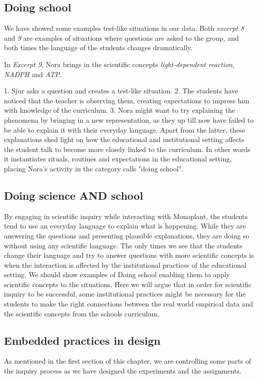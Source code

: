 \subsection{Doing school}
We have showed some examples test-like situations in our data. Both \emph{excerpt 8} and \emph{9} are examples of situations where questions are asked to the group, and both times the language of the students changes dramatically. 

In \emph{Excerpt 9}, Nora brings in the scientific concepts \emph{light-dependent reaction}, \emph{NADPH} and \emph{ATP}. 

1. Sjur asks a question and creates a test-like situation. 2. The students have noticed that the teacher is observing them, creating expectations to impress him with knowledge of the curriculum. 3. Nora might want to try explaining the phenomena by bringing in a new representation, as they up till now have failed to be able to explain it with their everyday language. Apart from the latter, these explanations shed light on how the educational and institutional setting affects the student talk to become more closely linked to the curriculum. In other words it instantiates rituals, routines and expectations in the educational setting, placing Nora's activity in the category \citet{jimenez2000doing} calls "doing school". 


\subsection{Doing science AND school}
By engaging in scientific inquiry while interacting with Monoplant, the students tend to use an everyday language to explain what is happening. While they are answering the questions and presenting plausible explanations, they are doing so without using any scientific language. The only times we see that the students change their language and try to answer questions with more scientific concepts is when the interaction is affected by the institutional practices of the educational setting.  We should show examples of Doing school enabling them to apply scientific concepts to the situations.
Here we will argue that in order for scientific inquiry to be successful, some institutional practices might be necessary for the students to make the right connections between the real world empirical data and the scientific concepts from the schools curriculum. 

\subsection{Embedded practices in design}
As mentioned in the first section of this chapter, we are controlling some parts of the inquiry process as we have designed the experiments and the assignments. 

